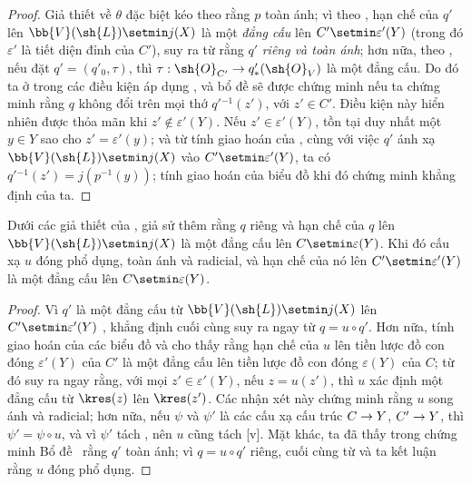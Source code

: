 \documentclass[oneside,10pt]{amsart}
\makeatletter
\newcommand{\ega@arrow}[2]{\mathchoice{#1}{#2}{#2}{#2}}
\renewcommand{\to}{\ega@arrow{\longrightarrow}{\rightarrow}}
\newcommand{\oldpage}[2][]{\marginnote{\normalfont\footnotesize\textbf{#1}~|~#2}\ignorespaces}
\let\EGAOriginalLabel\label
\renewcommand{\label}[1]{\phantomsection\EGAOriginalLabel{#1}}
\makeatother
\begin{document}
\begin{proof}
Giả thiết về $\theta$ đặc biệt kéo theo rằng $p$ toàn ánh;
vì theo , hạn chế của $q'$ lên $\bb{V}(\sh{L})\setmin j(X)$ là một \emph{đẳng cấu} lên $C'\setmin\varepsilon'(Y)$ (trong đó $\varepsilon'$ là tiết diện đỉnh của $C'$), suy ra từ  rằng $q'$ \emph{riêng và toàn ánh};
hơn nữa, theo , nếu đặt $q'=(q'_0,\tau)$, thì $\tau:\sh{O}_{C'}\to q'_*(\sh{O}_V)$ là một đẳng cấu.
Do đó ta ở trong các điều kiện áp dụng , và bổ đề sẽ được chứng minh nếu ta chứng minh rằng $q$ không đổi trên mọi thớ $q'{}^{-1}(z')$, với $z'\in C'$.
Điều kiện này hiển nhiên được thỏa mãn khi $z'\notin\varepsilon'(Y)$.
Nếu $z'\in\varepsilon'(Y)$, tồn tại duy nhất một $y\in Y$ sao cho $z'=\varepsilon'(y)$; và từ tính giao hoán của , cùng với việc $q'$ ánh xạ $\bb{V}(\sh{L})\setmin j(X)$ vào $C'\setmin\varepsilon'(Y)$, ta có $q'{}^{-1}(z')=j(p^{-1}(y))$;
tính giao hoán của biểu đồ  khi đó chứng minh khẳng định của ta.
\end{proof}

\begin{corollary}[8.11.6]
\label{II.8.11.6}
Dưới các giả thiết của , giả sử thêm rằng $q$ riêng và hạn chế của $q$ lên $\bb{V}(\sh{L})\setmin j(X)$ là một đẳng cấu lên $C\setmin\varepsilon(Y)$.
Khi đó cấu xạ $u$ đóng phổ dụng, toàn ánh và radicial, và hạn chế của nó lên $C'\setmin\varepsilon'(Y)$ là một đẳng cấu lên $C\setmin\varepsilon(Y)$.
\end{corollary}

\begin{proof}
Vì $q'$ là một đẳng cấu từ $\bb{V}(\sh{L})\setmin j(X)$ lên $C'\setmin\varepsilon'(Y)$ , khẳng định cuối cùng suy ra ngay từ $q=u\circ q'$.
Hơn nữa, tính giao hoán của các biểu đồ
\oldpage[II]{191}
 và  cho thấy rằng hạn chế của $u$ lên tiền lược đồ con đóng $\varepsilon'(Y)$ của $C'$ là một đẳng cấu lên tiền lược đồ con đóng $\varepsilon(Y)$ của $C$; từ đó suy ra ngay rằng, với mọi $z'\in\varepsilon'(Y)$, nếu $z=u(z')$, thì $u$ xác định một đẳng cấu từ $\kres(z)$ lên $\kres(z')$.
Các nhận xét này chứng minh rằng $u$ song ánh và radicial;
hơn nữa, nếu $\psi$ và $\psi'$ là các cấu xạ cấu trúc $C\to Y$, $C'\to Y$, thì $\psi'=\psi\circ u$, và vì $\psi'$ tách , nên $u$ cũng tách [v].
Mặt khác, ta đã thấy trong chứng minh Bổ đề~ rằng $q'$ toàn ánh;
vì $q=u\circ q'$ riêng, cuối cùng từ  và  ta kết luận rằng $u$ đóng phổ dụng.
\end{proof}
\end{document}
